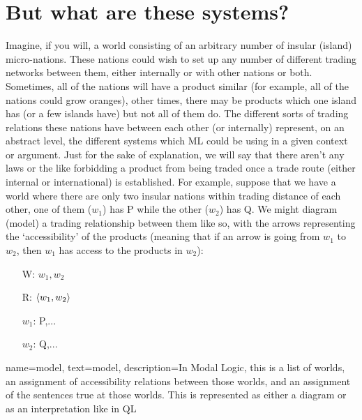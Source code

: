 \section{But what are these systems?}

Imagine, if you will, a world consisting of an arbitrary number of insular (island) micro-nations. These nations could wish to set up any number of different trading networks between them, either internally or with other nations or both. Sometimes, all of the nations will have a product similar (for example, all of the nations could grow oranges), other times, there may be products which one island has (or a few islands have) but not all of them do. The different sorts of trading relations these nations have between each other (or internally) represent, on an abstract level, the different systems which ML could be using in a given context or argument. Just for the sake of explanation, we will say that there aren't any laws or the like forbidding a product from being traded once a trade route (either internal or international) is established. For example, suppose that we have a world where there are only two insular nations within trading distance of each other, one of them ($w_1$) has P while the other ($w_2$) has Q. We might diagram (\gls{model}) a trading relationship between them like so, with the arrows representing the `accessibility' of the products (meaning that if an arrow is going from $w_1$ to $w_2$, then $w_1$ has access to the products in $w_2$):\\
\begin{center}
\end{center}
\begin{itemize}
\item[W:] $w_1,w_2$
\item[R:]$\langle w_1,w_2\rangle$  
\item[$w_1$:] P,...
\item[$w_2$:] Q,...
\end{itemize}
   
{
name={model},
text={model},
description={In Modal Logic, this is a list of worlds, an assignment of accessibility relations between those worlds, and an assignment of the sentences true at those worlds. This is represented as either a diagram or as an interpretation like in QL}
}
  
